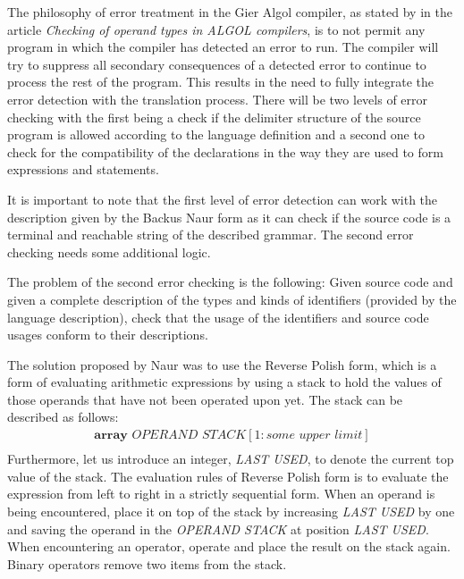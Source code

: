 \documentclass{article}
\begin{document}
The philosophy of error treatment in the Gier Algol compiler, as stated by \cite{naur1965checking} in the article \textit{Checking of operand types in ALGOL compilers}, is to not permit any program in which the compiler has detected an error to run. The compiler will try to suppress all secondary consequences of a detected error to continue to process the rest of the program. This results in the need to fully integrate the error detection with the translation process. There will be two levels of error checking with the first being a check if the delimiter structure of the source program is allowed according to the language definition and a second one to check for the compatibility of the declarations in the way they are used to form expressions and statements.

It is important to note that the first level of error detection can work with the description given by the Backus Naur form as it can check if the source code is a terminal and reachable string of the described grammar. The second error checking needs some additional logic. 

The problem of the second error checking is the following: Given source code and given a complete description of the types and kinds of identifiers (provided by the language description), check that the usage of the identifiers and source code usages conform to their descriptions.

The solution proposed by Naur was to use the Reverse Polish form, which is a form of evaluating arithmetic expressions by using a stack to hold the values of those operands that have not been operated upon yet. The stack can be described as follows:
\\
\begin{equation} \label{eq6}
	\begin{split}
		\textbf{array} \textit{ OPERAND STACK}[1:\textit{some upper limit}]\\
	\end{split}
\end{equation}
Furthermore, let us introduce an integer, \textit{LAST USED}, to denote the current top value of the stack. The evaluation rules of Reverse Polish form is to evaluate the expression from left to right in a strictly sequential form. When an operand is being encountered, place it on top of the stack by increasing \textit{LAST USED} by one and saving the operand in the \textit{OPERAND STACK} at position \textit{LAST USED}. When encountering an operator, operate and place the result on the stack again. Binary operators remove two items from the stack.
\end{document}
